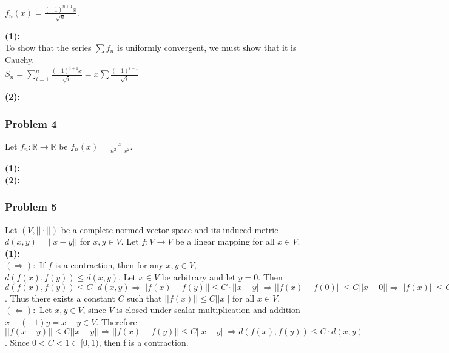 \documentclass{article}
\newcommand{\R}{\mathbb{R}}
\begin{document}
\centerline{$f_n(x) = \frac{(-1)^{n+1}x}{\sqrt{n}}$.}

\vspace{1pc}

\noindent \textbf{(1):} \\
To show that the series $\sum f_n$ is uniformly convergent, we must show that it is Cauchy.\\

$S_n = \sum_{i = 1}^n \frac{(-1)^{i+1}x}{\sqrt{i}} = x \sum \frac{(-1)^{i+1}}{\sqrt{i}}$

\noindent \textbf{(2):} \\

\subsubsection*{Problem 4}
Let $f_n : \R \rightarrow \R$ be $f_n(x) = \frac{x}{n^2 + x^2}$. 

\noindent \textbf{(1):} \\

\noindent \textbf{(2):} \\

\subsubsection*{Problem 5}
Let $(V, ||\cdot||)$ be a complete normed vector space and its induced metric $d(x, y) = ||x - y||$ for $x, y \in V$. Let $f: V \rightarrow V$ be a linear mapping for all $x \in V$.\\

\noindent \textbf{(1):} \\

$\mathbf{(\Rightarrow):}$ If $f$ is a contraction, then for any $x, y \in V$, $d(f(x), f(y)) \leq d(x, y)$. Let $x \in V$ be arbitrary and let $y = 0$. Then $d(f(x), f(y)) \leq C \cdot d(x, y) \Rightarrow ||f(x) - f(y)|| \leq C \cdot ||x - y|| \Rightarrow ||f(x) - f(0)|| \leq C ||x - 0|| \Rightarrow ||f(x)|| \leq C ||x||$. Thus there exists a constant $C$ such that $||f(x)|| \leq C||x||$ for all $x \in V$.\\

$\mathbf{(\Leftarrow):}$ Let $x, y \in V$, since $V$ is closed under scalar multiplication and addition $x + (-1)y = x - y \in V$. Therefore $||f(x-y)|| \leq C||x-y|| \Rightarrow ||f(x) - f(y)|| \leq C||x-y|| \Rightarrow d(f(x), f(y)) \leq C \cdot d(x, y)$. Since $0 < C < 1 \subset [0, 1)$, then f is a contraction.\\
\end{document}
